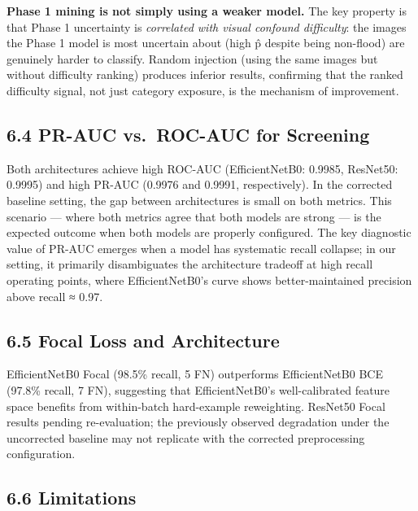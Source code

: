 \documentclass[
  11pt,
]{article}
\begin{document}
\textbf{Phase 1 mining is not simply using a weaker model.} The key
property is that Phase 1 uncertainty is \emph{correlated with visual
confound difficulty}: the images the Phase 1 model is most uncertain
about (high p̂ despite being non-flood) are genuinely harder to classify.
Random injection (using the same images but without difficulty ranking)
produces inferior results, confirming that the ranked difficulty signal,
not just category exposure, is the mechanism of improvement.

\subsection{6.4 PR-AUC vs.~ROC-AUC for
Screening}\label{pr-auc-vs.-roc-auc-for-screening}

Both architectures achieve high ROC-AUC (EfficientNetB0: 0.9985,
ResNet50: 0.9995) and high PR-AUC (0.9976 and 0.9991, respectively). In
the corrected baseline setting, the gap between architectures is small
on both metrics. This scenario --- where both metrics agree that both
models are strong --- is the expected outcome when both models are
properly configured. The key diagnostic value of PR-AUC emerges when a
model has systematic recall collapse; in our setting, it primarily
disambiguates the architecture tradeoff at high recall operating points,
where EfficientNetB0's curve shows better-maintained precision above
recall ≈ 0.97.

\subsection{6.5 Focal Loss and
Architecture}\label{focal-loss-and-architecture}

EfficientNetB0 Focal (98.5\% recall, 5 FN) outperforms EfficientNetB0
BCE (97.8\% recall, 7 FN), suggesting that EfficientNetB0's
well-calibrated feature space benefits from within-batch hard-example
reweighting. ResNet50 Focal results pending re-evaluation; the
previously observed degradation under the uncorrected baseline may not
replicate with the corrected preprocessing configuration.

\subsection{6.6 Limitations}\label{limitations}
\end{document}
